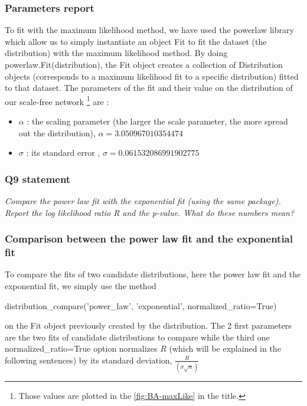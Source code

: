 \documentclass{article}
\begin{document}
\subsubsection*{Parameters report}
To fit with the maximum likelihood method, we have used the {\selectfont powerlaw} library which allow us to simply instantiate an object {\selectfont Fit} to fit the dataset (the distribution) with the maximum likelihood method. 
By doing {\selectfont powerlaw.Fit(distribution)}, the Fit object creates a collection of Distribution objects (corresponds to a maximum likelihood fit to a specific distribution) fitted to that dataset.   
The parameters of the fit and their value on the distribution of our scale-free network \footnote{Those values are plotted in the \autoref{fig:BA-maxLike} in the title.} are : 
\begin{itemize}
\item $\alpha$ : the scaling parameter (the larger the scale parameter, the more spread out the distribution), $\alpha =  3.050967010354474$ 
\item $\sigma$ : its standard error , $\sigma = 0.061532086991902775$
\end{itemize}
 
\newpage
\subsubsection{Q9 statement}
\textit{Compare the power law fit with the exponential fit (using the same package). Report the log likelihood ratio R and the p-value. What do these numbers mean?}

\subsubsection*{Comparison between the power law fit and the exponential fit}
To compare the fits of two candidate distributions, here the power law fit and the exponential fit, we simply use the method 
\begin{center}
{\selectfont distribution\_compare('power\_law', 'exponential', normalized\_ratio=True)}
\end{center}
on the {\selectfont Fit} object previously created by the distribution. 
The 2 first parameters are the two fits of candidate distributions to compare while the third one {\selectfont normalized\_ratio=True} option normalizes $R$ (which will be explained in the following sentences) by its standard deviation, $\frac{R}{(\sigma \sqrt{n})}$ \\
\end{document}
